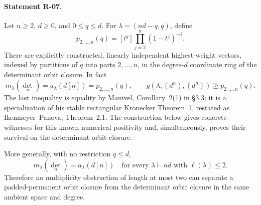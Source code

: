 \paragraph{Statement R-07.}
Let $n\geq2$, $d\geq0$, and $0\leq q\leq d$. For
$\lambda=(nd-q,q)$, define
\[
 p_{2,\ldots,n}(q)=[t^q]\prod_{j=2}^n(1-t^j)^{-1}.
\]
There are explicitly constructed, linearly independent highest-weight
vectors, indexed by partitions of $q$ into parts $2,\ldots,n$, in the
degree-$d$ coordinate ring of the determinant orbit closure. In fact
\begin{equation}\label{R07:positive}
 m_\lambda(\det_n)=a_\lambda(d[n])=p_{2,\ldots,n}(q),
 \qquad
 g(\lambda,(d^n),(d^n))\geq p_{2,\ldots,n}(q).
\end{equation}
The last inequality is equality by Manivel, Corollary~2(1) in \S3.3; it is a specialization of his
stable rectangular Kronecker Theorem~1, restated as
Ikenmeyer--Panova, Theorem~2.1. The construction below gives concrete witnesses for this
known numerical positivity and, simultaneously, proves their survival
on the determinant orbit closure.

More generally, with no restriction $q\leq d$,
\begin{equation}\label{R07:alltwo}
 m_\lambda(\det_n)=a_\lambda(d[n])
 \quad\text{for every }\lambda\vdash nd\text{ with }\ell(\lambda)\leq2.
\end{equation}
Therefore no multiplicity obstruction of length at most two can
separate a padded-permanent orbit closure from the determinant orbit
closure in the same ambient space and degree.

